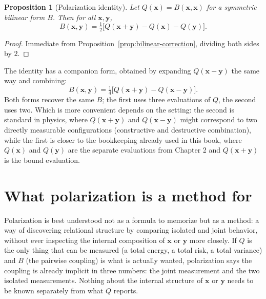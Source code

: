 \documentclass[11pt]{book}
\newtheorem{proposition}[theorem]{Proposition}
\begin{document}
\begin{proposition}[Polarization identity]
\label{prop:polarization}
Let $Q(\mathbf{x})=B(\mathbf{x},\mathbf{x})$ for a symmetric bilinear form $B$. Then for all $\mathbf{x},\mathbf{y}$,
\[
B(\mathbf{x},\mathbf{y}) = \tfrac{1}{2}\bigl[Q(\mathbf{x}+\mathbf{y})-Q(\mathbf{x})-Q(\mathbf{y})\bigr].
\]
\end{proposition}
\begin{proof}
Immediate from Proposition~\ref{prop:bilinear-correction}, dividing both sides by $2$.
\end{proof}

The identity has a companion form, obtained by expanding $Q(\mathbf{x}-\mathbf{y})$ the same way and combining:
\[
B(\mathbf{x},\mathbf{y}) = \tfrac{1}{4}\bigl[Q(\mathbf{x}+\mathbf{y}) - Q(\mathbf{x}-\mathbf{y})\bigr].
\]
Both forms recover the same $B$; the first uses three evaluations of $Q$, the second uses two. Which is more convenient depends on the setting: the second is standard in physics, where $Q(\mathbf{x}+\mathbf{y})$ and $Q(\mathbf{x}-\mathbf{y})$ might correspond to two directly measurable configurations (constructive and destructive combination), while the first is closer to the bookkeeping already used in this book, where $Q(\mathbf{x})$ and $Q(\mathbf{y})$ are the separate evaluations from Chapter 2 and $Q(\mathbf{x}+\mathbf{y})$ is the bound evaluation.

\section{What polarization is a method for}

Polarization is best understood not as a formula to memorize but as a method: a way of discovering relational structure by comparing isolated and joint behavior, without ever inspecting the internal composition of $\mathbf{x}$ or $\mathbf{y}$ more closely. If $Q$ is the only thing that can be measured (a total energy, a total risk, a total variance) and $B$ (the pairwise coupling) is what is actually wanted, polarization says the coupling is already implicit in three numbers: the joint measurement and the two isolated measurements. Nothing about the internal structure of $\mathbf{x}$ or $\mathbf{y}$ needs to be known separately from what $Q$ reports.
\end{document}
